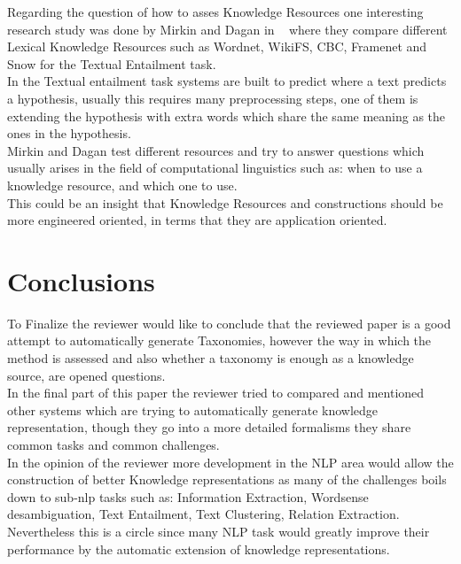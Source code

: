 \documentclass[4pt,a4paper,twocolumn]{article}
\begin{document}
Regarding the question of how to asses Knowledge Resources one interesting research study was done by Mirkin and Dagan in ~\cite{Mirkin:2009:EIU:1609067.1609129} where they compare different Lexical Knowledge Resources such as Wordnet, WikiFS, CBC, Framenet and Snow for the Textual Entailment task.\\
In the Textual entailment task systems are built to predict where a text predicts a hypothesis, usually this requires many preprocessing steps, one of them is extending the hypothesis with extra words which share the same meaning as the ones in the hypothesis.\\
Mirkin and Dagan test different resources and try to answer questions which usually arises in the field of computational linguistics such as: when to use a knowledge resource, and which one to use.\\
This could be an insight that Knowledge Resources and constructions should be more engineered oriented, in terms that they are application oriented.

\section{Conclusions}
To Finalize the reviewer would like to conclude that the reviewed paper is a good attempt to automatically generate Taxonomies, however the way in which the method is assessed and also whether a  taxonomy is enough as a knowledge source, are opened questions.\\
In the final part of this paper the reviewer tried to compared and mentioned other systems which are trying to automatically generate knowledge representation, though they go into a more detailed formalisms they share common tasks and common challenges.\\
In the opinion of the reviewer more development in the NLP area would allow the construction of better Knowledge representations as many of the challenges boils down to sub-nlp tasks such as: Information Extraction, Wordsense desambiguation, Text Entailment, Text Clustering, Relation Extraction.\\
Nevertheless this is a circle since many NLP task would greatly improve their performance by  the automatic extension of knowledge representations.







{}

\end{document}
